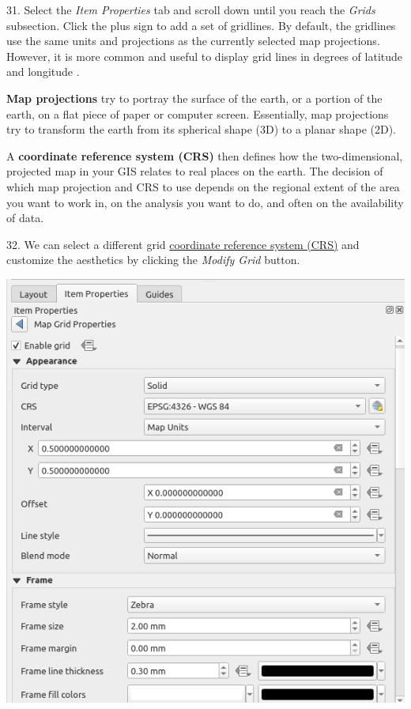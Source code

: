 \documentclass[oneside,a4paper,11pt,explicit]{book}
\begin{document}
31. Select the \textit{Item Properties} tab and scroll down until you reach the \textit{Grids} subsection. Click the plus sign to add a set of gridlines. By default, the gridlines use the same units and projections as the currently selected map projections. However, it is more common and useful to display grid lines in degrees of latitude and longitude . 

\begin{tcolorbox}[colback=yellow!5!white,colframe=IceCreamLeaf,title=Coordinate Reference Systems (CRS)]
\textbf{Map projections} try to portray the surface of the earth, or a portion of the earth, on a flat piece of paper or computer screen. Essentially, map projections try to transform the earth from its spherical shape (3D) to a planar shape (2D).

A \textbf{coordinate reference system (CRS)} then defines how the two-dimensional, projected map in your GIS relates to real places on the earth. The decision of which map projection and CRS to use depends on the regional extent of the area you want to work in, on the analysis you want to do, and often on the availability of data.
\end{tcolorbox}

32. We can select a different grid \href{https://en.wikipedia.org/wiki/Spatial_reference_system}{coordinate reference system (CRS)} and customize the aesthetics by clicking the \textit{Modify Grid} button.

\vspace{.25em}

\centerline{\includegraphics[width=.5\textwidth]{GridProps1.png}}
\end{document}
